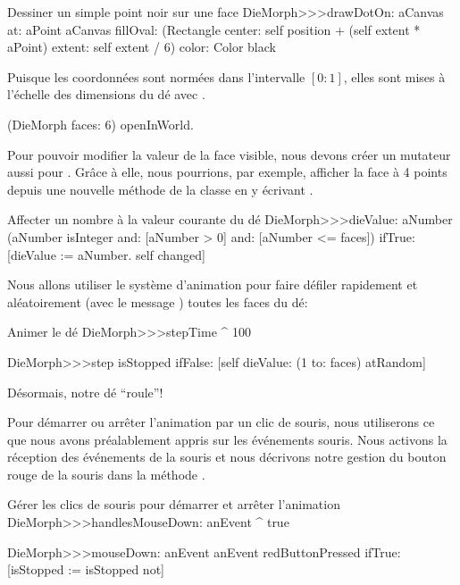 \documentclass[a4paper,10pt,twoside]{book}
\begin{document}
\begin{method}{Dessiner un simple point noir sur une face}
DieMorph>>>drawDotOn: aCanvas at: aPoint
	aCanvas
		fillOval: (Rectangle
			center: self position + (self extent * aPoint)
			extent: self extent / 6)
		color: Color black
\end{method}

Puisque les coordonnées sont normées dans l'intervalle $[0{:}1]$,
elles sont mises à l'échelle des dimensions du dé avec 
.

\begin{code}{}
(DieMorph faces: 6) openInWorld.
\end{code}

Pour pouvoir modifier la valeur de la face visible, nous devons
créer un mutateur aussi pour . 
Grâce à elle, nous pourrions, par exemple, afficher la face à 4
points depuis une nouvelle méthode de la classe en y écrivant
.

\begin{method}{Affecter un nombre à la valeur courante du dé}
DieMorph>>>dieValue: aNumber
	(aNumber isInteger
			and: [aNumber > 0]
			and: [aNumber <= faces])
		ifTrue:
			[dieValue := aNumber.
			self changed]
\end{method}

Nous allons utiliser le système d'animation pour faire défiler rapidement 
et aléatoirement (avec le message ) toutes les faces du dé:
\begin{methods}{Animer le dé}
DieMorph>>>stepTime
	^ 100

DieMorph>>>step
	isStopped ifFalse: [self dieValue: (1 to: faces) atRandom]
\end{methods}
Désormais, notre dé ``roule''!

Pour démarrer ou arrêter  l'animation par un clic de souris, nous
utiliserons ce que nous avons préalablement appris sur les
événements souris.
Nous activons la réception des événements de la souris et nous
décrivons notre gestion du bouton rouge de la souris dans la
méthode .       

\begin{methods}{Gérer les clics de souris pour démarrer et arrêter l'animation}
DieMorph>>>handlesMouseDown: anEvent
	^ true

DieMorph>>>mouseDown: anEvent
	anEvent redButtonPressed
		ifTrue: [isStopped := isStopped not]
\end{methods}
\end{document}
